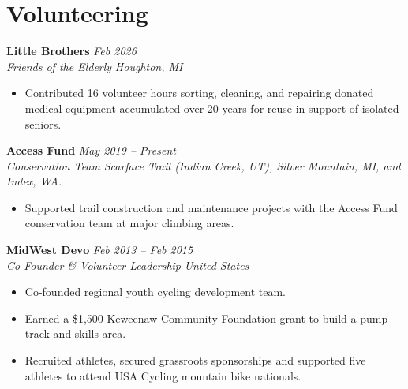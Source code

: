\documentclass[10pt,letterpaper]{article}
\newcommand{\resumeItem}[1]{\item \small #1}
\newcommand{\resumeSubheading}[4]{%
  \textbf{#1} \hfill \small{\textit{#2}}\\
  \small{\textit{#3}} \hfill \small{\textit{#4}}\par
}
\begin{document}
\section*{Volunteering}
\resumeSubheading{Little Brothers}{Feb 2026}{Friends of the Elderly}{Houghton, MI}
\begin{itemize}
  \resumeItem{Contributed 16 volunteer hours sorting, cleaning, and repairing donated medical equipment accumulated over 20 years for reuse in support of isolated seniors.}
\end{itemize}

\resumeSubheading{Access Fund}{May 2019 -- Present}{Conservation Team}{Scarface Trail (Indian Creek, UT), Silver Mountain, MI, and Index, WA.}
\begin{itemize}
  \resumeItem{Supported trail construction and maintenance projects with the Access Fund conservation team at major climbing areas.}
\end{itemize}

\resumeSubheading{MidWest Devo}{Feb 2013 -- Feb 2015}{Co-Founder \& Volunteer Leadership}{United States}
\begin{itemize}
  \resumeItem{Co-founded regional youth cycling development team.}
  \resumeItem{Earned a \$1,500 Keweenaw Community Foundation grant to build a pump track and skills area.}
  \resumeItem{Recruited athletes, secured grassroots sponsorships and supported five athletes to attend USA Cycling mountain bike nationals.}
\end{itemize}
\end{document}
